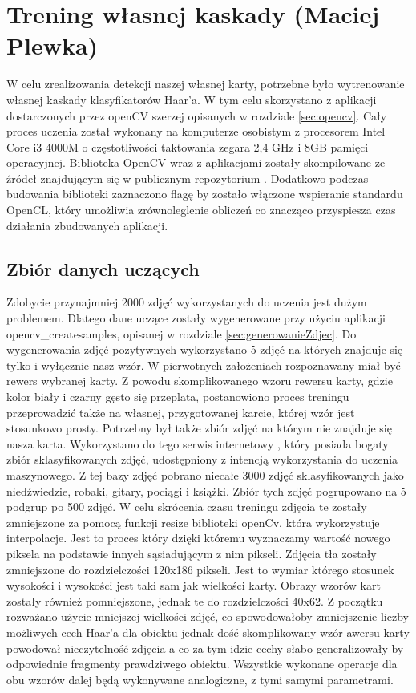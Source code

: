 \section{Trening własnej kaskady (Maciej Plewka)}

W celu zrealizowania detekcji naszej własnej karty, potrzebne było wytrenowanie własnej kaskady klasyfikatorów Haar'a. W tym celu skorzystano z aplikacji dostarczonych przez openCV szerzej opisanych w rozdziale \ref{sec:opencv}. Cały proces uczenia został wykonany na komputerze osobistym z procesorem Intel Core i3 4000M o częstotliwości taktowania zegara 2,4 GHz i 8GB pamięci operacyjnej. Biblioteka OpenCV wraz z aplikacjami zostały skompilowane ze źródeł znajdującym się w publicznym repozytorium \cite{OpenCVSource}. Dodatkowo podczas budowania biblioteki zaznaczono flagę by zostało włączone wspieranie standardu OpenCL, który umożliwia zrównoleglenie obliczeń co znacząco przyspiesza czas działania zbudowanych aplikacji.

\subsection{Zbiór danych uczących}

Zdobycie przynajmniej 2000 zdjęć wykorzystanych do uczenia jest dużym problemem. Dlatego dane uczące zostały wygenerowane przy użyciu aplikacji opencv\_createsamples, opisanej w rozdziale \ref{sec:generowanieZdjec}. Do wygenerowania zdjęć pozytywnych wykorzystano 5 zdjęć na których znajduje się tylko i wyłącznie nasz wzór. W pierwotnych założeniach rozpoznawany miał być rewers wybranej karty. Z powodu skomplikowanego wzoru rewersu karty, gdzie kolor biały i czarny gęsto się przeplata, postanowiono proces treningu przeprowadzić także na własnej, przygotowanej karcie, której wzór jest stosunkowo prosty. Potrzebny był także zbiór zdjęć na którym nie znajduje się nasza karta. Wykorzystano do tego serwis internetowy \cite{imageNetOrg}, który posiada bogaty zbiór sklasyfikowanych zdjęć, udostępniony z intencją wykorzystania do uczenia maszynowego. Z tej bazy zdjęć pobrano niecałe 3000 zdjęć sklasyfikowanych jako niedźwiedzie, robaki, gitary, pociągi i książki. Zbiór tych zdjęć pogrupowano na 5 podgrup po 500 zdjęć. W celu skrócenia czasu treningu zdjęcia te zostały zmniejszone za pomocą funkcji resize biblioteki openCv, która wykorzystuje interpolacje. Jest to proces który dzięki któremu wyznaczamy wartość nowego piksela na podstawie innych sąsiadującym z nim pikseli. Zdjęcia tła zostały zmniejszone do rozdzielczości 120x186 pikseli. Jest to wymiar którego stosunek wysokości i wysokości jest taki sam jak wielkości karty. Obrazy wzorów kart zostały również pomniejszone, jednak te do rozdzielczości 40x62. Z początku rozważano użycie mniejszej wielkości zdjęć, co spowodowałoby zmniejszenie liczby możliwych cech Haar'a dla obiektu jednak dość skomplikowany wzór awersu karty powodował nieczytelność zdjęcia a co za tym idzie cechy słabo generalizowały by odpowiednie fragmenty prawdziwego obiektu. Wszystkie wykonane operacje dla obu wzorów dalej będą wykonywane analogiczne, z tymi samymi parametrami.

